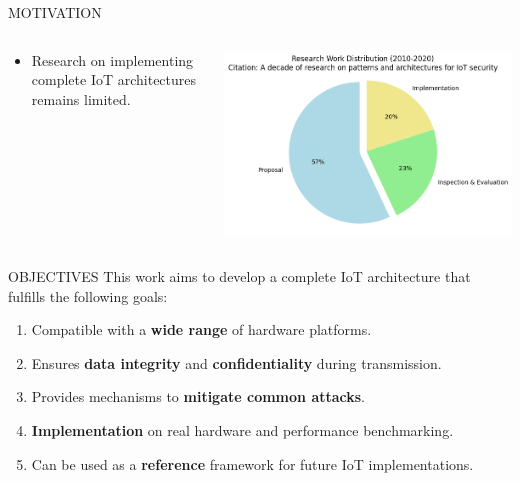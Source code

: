 \begin{frame}{MOTIVATION}
    \begin{columns}
        \begin{column}{0.45\textwidth}
            \begin{itemize}
                \item Research on implementing complete IoT architectures remains limited.
            \end{itemize}
        \end{column}
        \begin{column}{0.55\textwidth}
            \centering
            \includegraphics[width=1\linewidth]{pic/research2.png}
        \end{column}
    \end{columns}
\end{frame}

\begin{frame}{OBJECTIVES}
This work aims to develop a complete IoT architecture that fulfills the following goals:
\begin{enumerate}
    \item Compatible with a \textbf{wide range} of hardware platforms.
    \item Ensures \textbf{data integrity} and \textbf{confidentiality} during transmission.
    \item Provides mechanisms to \textbf{mitigate common attacks}.
    \item \textbf{Implementation} on real hardware and performance benchmarking.
    \item Can be used as a \textbf{reference} framework for future IoT implementations.
\end{enumerate}
\end{frame}
